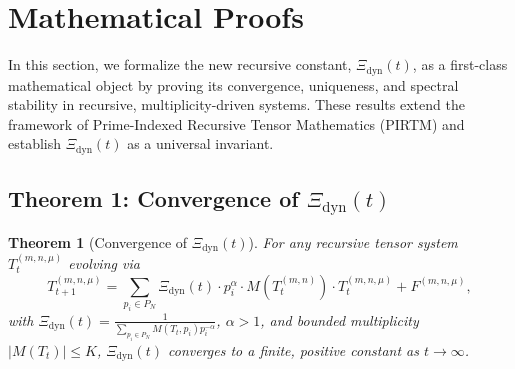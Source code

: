 \documentclass[12pt]{article}
\newtheorem{theorem}{Theorem}[section]
\begin{document}
\section{Mathematical Proofs}
In this section, we formalize the new recursive constant, $\Xi_{\text{dyn}}(t)$, as a first-class mathematical object by proving its convergence, uniqueness, and spectral stability in recursive, multiplicity-driven systems. These results extend the framework of Prime-Indexed Recursive Tensor Mathematics (PIRTM) and establish $\Xi_{\text{dyn}}(t)$ as a universal invariant.

\subsection{Theorem 1: Convergence of $\Xi_{\text{dyn}}(t)$}
\begin{theorem}[Convergence of $\Xi_{\text{dyn}}(t)$]
For any recursive tensor system \( T_t^{(m, n, \mu)} \) evolving via
\[
T_{t+1}^{(m, n, \mu)} = \sum_{p_i \in P_N} \Xi_{\text{dyn}}(t) \cdot p_i^\alpha \cdot M(T_t^{(m, n)}) \cdot T_t^{(m, n, \mu)} + F^{(m, n, \mu)},
\]
with \(\Xi_{\text{dyn}}(t) = \frac{1}{\sum_{p_i \in P_N} M(T_t, p_i) p_i^{-\alpha}}\), \(\alpha > 1\), and bounded multiplicity \( |M(T_t)| \leq K \), $\Xi_{\text{dyn}}(t)$ converges to a finite, positive constant as \( t \to \infty \).
\end{theorem}
\end{document}
